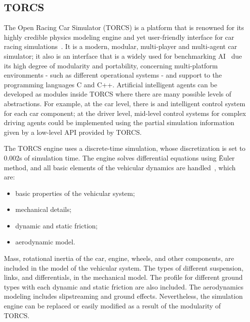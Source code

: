 \subsection{TORCS} \label{subsec:TORCS}

	The Open Racing Car Simulator (TORCS) is a platform that is renowned for its highly credible physics modeling engine and yet user-friendly interface for car racing simulations~\cite{TORCS}. It is a modern, modular, multi-player and multi-agent car simulator; it also is an interface that is a widely used for benchmarking AI~\cite{2009} due its high degree of modularity and portability, concerning multi-platform environments - such as different operational systems - and support to the programming languages C and C++. Artificial intelligent agents can be developed as modules inside TORCS where there are many possible levels of abstractions. For example, at the car level, there is and intelligent control system for each car component; at the driver level, mid-level control systems for complex driving agents could be implemented using the partial simulation information given by a low-level API provided by TORCS.

	The TORCS engine uses a discrete-time simulation, whose discretization is set to 0.002s of simulation time. The engine solves differential equations using \"{E}uler method, and all basic elements of the vehicular dynamics are handled~\cite{SIMUTORCS}, which are:

	\begin{itemize}
		
		\item basic properties of the vehicular system;
		
		\item mechanical details;
		
		\item dynamic and static friction;
		
		\item aerodynamic model.
		
	\end{itemize}

	Mass, rotational inertia of the car, engine, wheels, and other components, are included in the model of the vehicular system. The types of different suspension, links, and differentials, in the mechanical model. The profile for different ground types with each dynamic and static friction are also included. The aerodynamics modeling includes slipstreaming and ground effects. Nevertheless, the simulation engine can be replaced or easily modified as a result of the modularity of TORCS.
	
